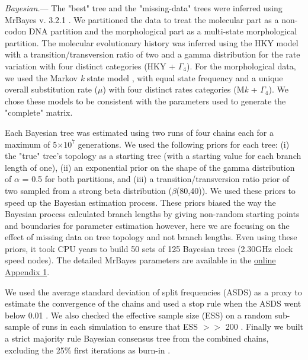 \documentclass[12pt,letterpaper]{article}
\renewcommand{\subsubsection}[1]{%
\vspace{2ex}
\noindent
\textit{#1.}---}
\begin{document}
\subsubsection{Bayesian}
The "best" tree and the "missing-data" trees were inferred using MrBayes v. 3.2.1 \citep{Ronquist2012mrbayes}. We partitioned the data to treat the molecular part as a non-codon DNA partition and the morphological part as a multi-state morphological partition. The molecular evolutionary history was inferred using the HKY model with a transition/transversion ratio of two \citep{douadycomparison2003} and a gamma distribution for the rate variation with four distinct categories (HKY + $\Gamma_4$). For the morphological data, we used the Markov \textit{k} state model \citep{lewisa2001}, with equal state frequency and a unique overall substitution rate ($\mu$) with four distinct rates categories (M\textit{k} + $\Gamma_4$). We chose these models to be consistent with the parameters used to generate the "complete" matrix.

Each Bayesian tree was estimated using two runs of four chains each for a maximum of 5$\times$$10^7$ generations. We used the following priors for each tree: (i) the "true" tree’s topology as a starting tree (with a starting value for each branch length of one), (ii) an exponential prior on the shape of the gamma distribution of $\alpha$ = 0.5 for both partitions, and (iii) a transition/transversion ratio prior of two sampled from a strong beta distribution ($\beta$(80,40)). We used these priors to speed up the Bayesian estimation process. These priors biased the way the Bayesian process calculated branch lengths by giving non-random starting points and boundaries for parameter estimation however, here we are focusing on the effect of missing data on tree topology and not branch lengths. Even using these priors, it took  CPU years to build 50 sets of 125 Bayesian trees (2.30GHz clock speed nodes). The detailed MrBayes parameters are available in the \hyperref[SupplementaryMaterial]{online Appendix 1}.

We used the average standard deviation of split frequencies (ASDS) as a proxy to estimate the convergence of the chains and used a stop rule when the ASDS went below 0.01 \citep{Ronquist2012mrbayes}. We also checked the effective sample size (ESS) on a random sub-sample of runs in each simulation to ensure that ESS $>>$ 200 \citep{drummond2006ess}. Finally we built a strict majority rule Bayesian consensus tree from the combined chains, excluding the 25\% first iterations as burn-in \citep{Ronquist2012mrbayes}.
\end{document}
